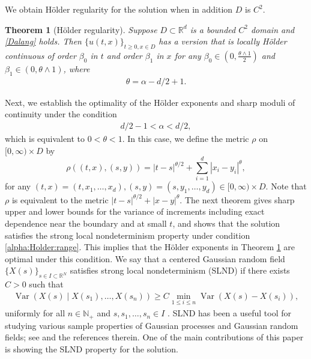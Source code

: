 \documentclass[reqno]{amsart}
\DeclareMathOperator{\Var}{Var}
\newcommand{\R}{\mathbb R}
\newcommand{\N}{\mathbb N}
\newcommand{\1}{\mathbf 1}
\numberwithin{equation}{section}
\newtheorem{theorem}{Theorem}[section]
\theoremstyle{definition}
\begin{document}
We obtain H\"older regularity for the solution when in addition $D$ is $C^2$.

\begin{theorem}[H\"older regularity]\label{thm:reg}
Suppose $D \subset \R^d$ is a bounded $C^2$ domain and \eqref{Dalang} holds.
Then $\{u(t,x)\}_{t \ge 0, x \in D}$ has a version that is locally H\"older continuous of order $\beta_0$ in $t$ and order $\beta_1$ in $x$ for any $\beta_0 \in (0, \frac{\theta\wedge 1}{2})$
and $\beta_1 \in (0,\theta\wedge 1)$, where
\begin{align}\label{theta}
	\theta=\alpha-d/2+1.
\end{align}
\end{theorem}

Next, we establish the optimality of the H\"older exponents and sharp moduli of continuity under the condition
\begin{align}\label{alpha:Holder:range}
	d/2-1<\alpha<d/2,
\end{align}
which is equivalent to $0<\theta<1$.
In this case, we define the metric $\rho$ on $[0,\infty) \times D$ by
\begin{equation}\label{eq:rho}
    \rho((t,x),(s,y))
    =|t-s|^{\theta/2}+\sum_{i=1}^d |x_i-y_i|^{\theta},
\end{equation}
for any $(t,x) = (t,x_1,\dots, x_d), (s,y) = (s,y_1,\dots, y_d) \in [0,\infty)\times D$.
Note that $\rho$ is equivalent to the metric $|t-s|^{\theta/2} + |x-y|^\theta$.
The next theorem gives sharp upper and lower bounds for the variance of increments including exact dependence near the boundary and at small $t$, and shows that the solution satisfies the strong local nondeterminism property under condition \eqref{alpha:Holder:range}.
This implies that the H\"older exponents in Theorem \ref{thm:reg} are optimal under this condition.
We say that a centered Gaussian random field $\{ X(s) \}_{s \in I \subset \R^N}$ satisfies strong local nondeterminism (SLND) if there exists $C>0$ such that
\begin{align}\label{SLND}
	\Var(X(s)\mid X(s_1),\dots, X(s_n)) \ge C \min_{1\le i\le n} \Var(X(s)-X(s_i)),
\end{align}
uniformly for all $n \in \N_+$ and $s,s_1,\dots, s_n \in I$ \cite{Berman, Pitt, CD82, MP87, Xiao08}.
SLND has been a useful tool for studying various sample properties of Gaussian processes and Gaussian random fields; see \cite{X09,Xiao08} and the references therein.
One of the main contributions of this paper is showing the SLND property for the solution.
\end{document}
